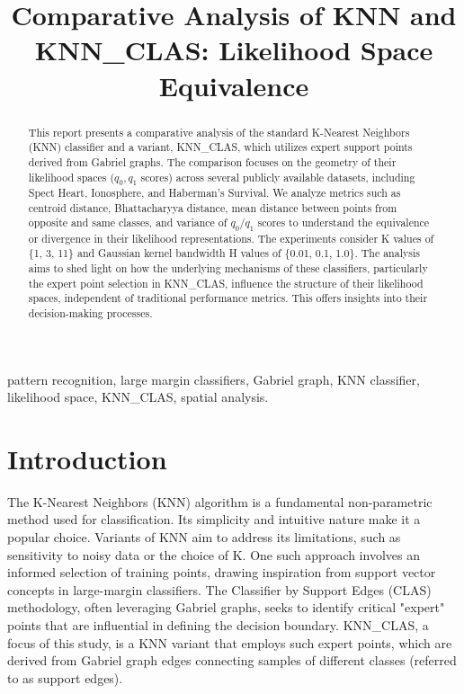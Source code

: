 \documentclass[conference]{IEEEtran}
\begin{document}
\title{Comparative Analysis of KNN and KNN\_CLAS: Likelihood Space Equivalence}

\author{
}

\maketitle

\begin{abstract}
This report presents a comparative analysis of the standard K-Nearest Neighbors (KNN) classifier and a variant, KNN\_CLAS, which utilizes expert support points derived from Gabriel graphs. The comparison focuses on the geometry of their likelihood spaces ($q_0, q_1$ scores) across several publicly available datasets, including Spect Heart, Ionosphere, and Haberman's Survival. We analyze metrics such as centroid distance, Bhattacharyya distance, mean distance between points from opposite and same classes, and variance of $q_0$/$q_1$ scores to understand the equivalence or divergence in their likelihood representations. The experiments consider K values of \{1, 3, 11\} and Gaussian kernel bandwidth H values of \{0.01, 0.1, 1.0\}. The analysis aims to shed light on how the underlying mechanisms of these classifiers, particularly the expert point selection in KNN\_CLAS, influence the structure of their likelihood spaces, independent of traditional performance metrics. This offers insights into their decision-making processes.
\end{abstract}

\begin{IEEEkeywords}
pattern recognition, large margin classifiers, Gabriel graph, KNN classifier, likelihood space, KNN\_CLAS, spatial analysis.
\end{IEEEkeywords}

\section{Introduction}
The K-Nearest Neighbors (KNN) algorithm is a fundamental non-parametric method used for classification. Its simplicity and intuitive nature make it a popular choice. Variants of KNN aim to address its limitations, such as sensitivity to noisy data or the choice of K. One such approach involves an informed selection of training points, drawing inspiration from support vector concepts in large-margin classifiers. The Classifier by Support Edges (CLAS) methodology, often leveraging Gabriel graphs, seeks to identify critical "expert" points that are influential in defining the decision boundary. KNN\_CLAS, a focus of this study, is a KNN variant that employs such expert points, which are derived from Gabriel graph edges connecting samples of different classes (referred to as support edges).
\end{document}
